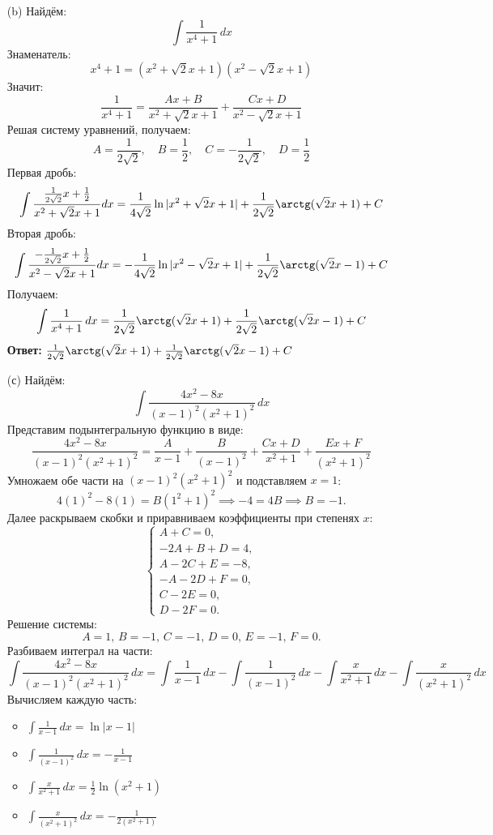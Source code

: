 \documentclass[a4paper]{article}
\begin{document}
\begin{enumerate}
\begin{enumerate}
    \item[(b)]Найдём:
    $$\int \frac{1}{x^4 + 1} \, dx $$
    Знаменатель:
    \[
    x^4 + 1 = (x^2 + \sqrt{2}x + 1)(x^2 - \sqrt{2}x + 1)
    \]
    Значит:
    \[
    \frac{1}{x^4 + 1} = \frac{Ax + B}{x^2 + \sqrt{2}x + 1} + \frac{Cx + D}{x^2 - \sqrt{2}x + 1}
    \]
    Решая систему уравнений, получаем:  
    \[
    A = \frac{1}{2\sqrt{2}}, \quad B = \frac{1}{2}, \quad C = -\frac{1}{2\sqrt{2}}, \quad D = \frac{1}{2}
    \]
    Первая дробь:
    \[
    \int \frac{\frac{1}{2\sqrt{2}}x + \frac{1}{2}}{x^2 + \sqrt{2}x + 1} dx = \frac{1}{4\sqrt{2}} \ln|x^2 + \sqrt{2}x + 1| + \frac{1}{2\sqrt{2}} \arctg(\sqrt{2}x + 1) + C
    \]
    Вторая дробь:
    \[
    \int \frac{-\frac{1}{2\sqrt{2}}x + \frac{1}{2}}{x^2 - \sqrt{2}x + 1} dx= -\frac{1}{4\sqrt{2}} \ln|x^2 - \sqrt{2}x + 1| + \frac{1}{2\sqrt{2}} \arctg(\sqrt{2}x - 1) + C
    \]
    Получаем:
    $$\int \frac{1}{x^4 + 1} \, dx = \frac{1}{2\sqrt{2}} \arctg(\sqrt{2}x + 1) + \frac{1}{2\sqrt{2}} \arctg(\sqrt{2}x - 1) + C$$
    \textbf{Ответ:} $\frac{1}{2\sqrt{2}} \arctg(\sqrt{2}x + 1) + \frac{1}{2\sqrt{2}} \arctg(\sqrt{2}x - 1) + C$\\
    
    \item[(с)]Найдём:
    $$\int \frac{4x^2 - 8x}{(x-1)^2(x^2 + 1)^2} \, dx$$
    Представим подынтегральную функцию в виде:  
    \[
    \frac{4x^2 - 8x}{(x-1)^2(x^2 + 1)^2} = \frac{A}{x - 1} + \frac{B}{(x - 1)^2} + \frac{Cx + D}{x^2 + 1} + \frac{Ex + F}{(x^2 + 1)^2}
    \]
    Умножаем обе части на \((x-1)^2(x^2 + 1)^2\) и подставляем \(x = 1\):  
    \[
    4(1)^2 - 8(1) = B(1^2 + 1)^2 \implies -4 = 4B \implies B = -1.
    \]  
    Далее раскрываем скобки и приравниваем коэффициенты при степенях \(x\):  
    \[
    \begin{cases} 
    A + C = 0, \\
    -2A + B + D = 4, \\
    A - 2C + E = -8, \\
    -A - 2D + F = 0, \\
    C - 2E = 0, \\
    D - 2F = 0.
    \end{cases}
    \]  
    Решение системы:  
    \[
    A = 1, \, B = -1, \, C = -1, \, D = 0, \, E = -1, \, F = 0.
    \]
    Разбиваем интеграл на части:  
    \small{\[
        \int \frac{4x^2 - 8x}{(x-1)^2(x^2 + 1)^2} \, dx= \int \frac{1}{x - 1} \, dx - \int \frac{1}{(x - 1)^2} \, dx - \int \frac{x}{x^2 + 1} \, dx - \int \frac{x}{(x^2 + 1)^2} \, dx
    \]}
    Вычисляем каждую часть:  
        \begin{itemize}
        \item \(\int \frac{1}{x - 1} \, dx = \ln|x - 1|\) 
        \item \(\int \frac{1}{(x - 1)^2} \, dx = -\frac{1}{x - 1}\)  
        \item \(\int \frac{x}{x^2 + 1} \, dx = \frac{1}{2} \ln(x^2 + 1)\)  
        \item \(\int \frac{x}{(x^2 + 1)^2} \, dx = -\frac{1}{2(x^2 + 1)}\) 
    \end{itemize}


\end{enumerate}
\end{enumerate}
\end{document}
